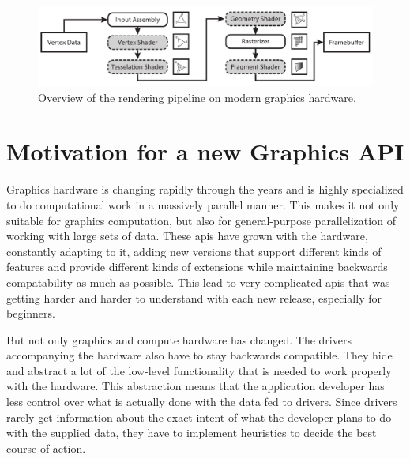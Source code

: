     \tbd
    \begin{figure}
      \includegraphics[width=\textwidth]{Main/Images/Rendering_Pipeline_Overview}
      \centering
      \caption{Overview of the rendering pipeline on modern graphics hardware.}
      \label{fig:Rendering_Pipeline_Overview}
    \end{figure}


  \section{Motivation for a new Graphics API}

    Graphics hardware is changing rapidly through the years and is highly specialized to do computational work in a massively parallel manner.
    This makes it not only suitable for graphics computation, but also for general-purpose parallelization of working with large sets of data.
    These \glspl{api} have grown with the hardware, constantly adapting to it, adding new versions that support different kinds of features and provide different kinds of extensions while maintaining backwards compatability as much as possible.
    This lead to very complicated \glspl{api} that was getting harder and harder to understand with each new release, especially for beginners.


    But not only graphics and compute hardware has changed.
    The drivers accompanying the hardware also have to stay backwards compatible.
    They hide and abstract a lot of the low-level functionality that is needed to work properly with the hardware.
    This abstraction means that the application developer has less control over what is actually done with the data fed to drivers.
    Since drivers rarely get information about the exact intent of what the developer plans to do with the supplied data, they have to implement heuristics to decide the best course of action.

